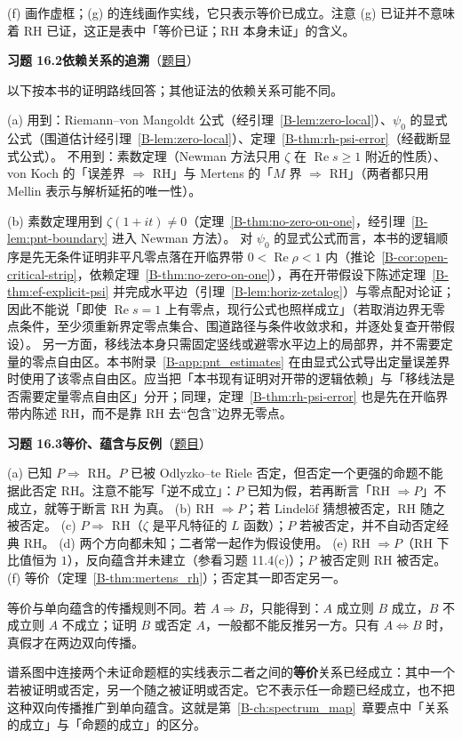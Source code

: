 \documentclass[11pt,a4paper]{article}
\renewcommand{\Re}{\operatorname{Re}}
\newcommand{\bref}[1]{\ref*{B-#1}}
\newcommand{\Sol}[2]{%
  \par\addvspace{1.2em}\noindent
  \hypertarget{s:#1}{}\textbf{习题 #1\quad #2}\hfill{\small（\hyperlink{q:#1}{题目}）}\par
  \nopagebreak\smallskip}
\begin{document}
(f) 画作虚框；(g) 的连线画作实线，它只表示等价已成立。注意 (g) 已证并不意味着 RH 已证，这正是表中「等价已证；RH 本身未证」的含义。

\Sol{16.2}{依赖关系的追溯}
以下按本书的证明路线回答；其他证法的依赖关系可能不同。

(a) 用到：Riemann--von Mangoldt 公式（经引理~\bref{lem:zero-local}）、$\psi_0$ 的显式公式（围道估计经引理~\bref{lem:zero-local}）、定理~\bref{thm:rh-psi-error}（经截断显式公式）。
不用到：素数定理（Newman 方法只用 $\zeta$ 在 $\Re s\ge1$ 附近的性质）、von Koch 的「误差界 $\Rightarrow$ RH」与 Mertens 的「$M$ 界 $\Rightarrow$ RH」（两者都只用 Mellin 表示与解析延拓的唯一性）。

(b) 素数定理用到 $\zeta(1+it)\neq0$（定理~\bref{thm:no-zero-on-one}，经引理~\bref{lem:pnt-boundary} 进入 Newman 方法）。
对 $\psi_0$ 的显式公式而言，本书的逻辑顺序是先无条件证明非平凡零点落在开临界带 $0<\Re\rho<1$ 内（推论~\bref{cor:open-critical-strip}，依赖定理~\bref{thm:no-zero-on-one}），再在开带假设下陈述定理~\bref{thm:ef-explicit-psi} 并完成水平边（引理~\bref{lem:horiz-zetalog}）与零点配对论证；因此不能说「即使 $\Re s=1$ 上有零点，现行公式也照样成立」（若取消边界无零点条件，至少须重新界定零点集合、围道路径与条件收敛求和，并逐处复查开带假设）。
另一方面，移线法本身只需固定竖线或避零水平边上的局部界，并不需要定量的零点自由区。本书附录~\bref{app:pnt_estimates} 在由显式公式导出定量误差界时使用了该零点自由区。应当把「本书现有证明对开带的逻辑依赖」与「移线法是否需要定量零点自由区」分开；同理，定理~\bref{thm:rh-psi-error} 也是先在开临界带内陈述 RH，而不是靠 RH 去“包含”边界无零点。

\Sol{16.3}{等价、蕴含与反例}
(a) 已知 $P\Rightarrow$ RH。$P$ 已被 Odlyzko--te Riele 否定，但否定一个更强的命题不能据此否定 RH。注意不能写「逆不成立」：$P$ 已知为假，若再断言「RH $\Rightarrow P$」不成立，就等于断言 RH 为真。
(b) RH $\Rightarrow P$；若 Lindelöf 猜想被否定，RH 随之被否定。
(c) $P\Rightarrow$ RH（$\zeta$ 是平凡特征的 $L$ 函数）；$P$ 若被否定，并不自动否定经典 RH。
(d) 两个方向都未知；二者常一起作为假设使用。
(e) RH $\Rightarrow P$（RH 下比值恒为 $1$），反向蕴含并未建立（参看习题 11.4(c)）；$P$ 被否定则 RH 被否定。
(f) 等价（定理~\bref{thm:mertens_rh}）；否定其一即否定另一。

等价与单向蕴含的传播规则不同。若 $A\Rightarrow B$，只能得到：$A$ 成立则 $B$ 成立，$B$ 不成立则 $A$ 不成立；证明 $B$ 或否定 $A$，一般都不能反推另一方。只有 $A\Leftrightarrow B$ 时，真假才在两边双向传播。

谱系图中连接两个未证命题框的实线表示二者之间的\textbf{等价}关系已经成立：其中一个若被证明或否定，另一个随之被证明或否定。它不表示任一命题已经成立，也不把这种双向传播推广到单向蕴含。这就是第~\bref{ch:spectrum_map}~章要点中「关系的成立」与「命题的成立」的区分。
\end{document}
